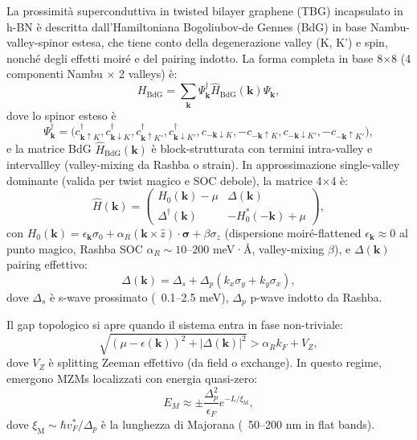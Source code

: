 \documentclass[11pt,a4paper]{article}
\theoremstyle{plain}
\theoremstyle{definition}
\begin{document}
La prossimità superconduttiva in twisted bilayer graphene (TBG) incapsulato in h-BN è descritta dall'Hamiltoniana Bogoliubov-de Gennes (BdG) in base Nambu-valley-spinor estesa, che tiene conto della degenerazione valley (K, K') e spin, nonché degli effetti moiré e del pairing indotto. La forma completa in base 8×8 (4 componenti Nambu × 2 valleys) è:
\begin{equation}
H_{\mathrm{BdG}} = \sum_{\mathbf{k}} \Psi^\dagger_{\mathbf{k}} \hat{H}_{\mathrm{BdG}}(\mathbf{k}) \Psi_{\mathbf{k}},
\end{equation}
dove lo spinor esteso è
\begin{equation}
\Psi^\dagger_{\mathbf{k}} = \bigl( c^\dagger_{\mathbf{k}\uparrow K}, c^\dagger_{\mathbf{k}\downarrow K}, c^\dagger_{\mathbf{k}\uparrow K'}, c^\dagger_{\mathbf{k}\downarrow K'}, 
c_{-\mathbf{k}\downarrow K}, -c_{-\mathbf{k}\uparrow K}, c_{-\mathbf{k}\downarrow K'}, -c_{-\mathbf{k}\uparrow K'} \bigr),
\end{equation}
e la matrice BdG $\hat{H}_{\mathrm{BdG}}(\mathbf{k})$ è block-strutturata con termini intra-valley e intervallley (valley-mixing da Rashba o strain). In approssimazione single-valley dominante (valida per twist magico e SOC debole), la matrice 4×4 è:
\begin{equation}
\hat{H}(\mathbf{k}) = \begin{pmatrix}
H_0(\mathbf{k}) - \mu & \Delta(\mathbf{k}) \\
\Delta^\dagger(\mathbf{k}) & -H_0^*(-\mathbf{k}) + \mu
\end{pmatrix},
\end{equation}
con $H_0(\mathbf{k}) = \epsilon_{\mathbf{k}} \sigma_0 + \alpha_R (\mathbf{k} \times \hat{z}) \cdot \boldsymbol{\sigma} + \beta \sigma_z$ (dispersione moiré-flattened $\epsilon_{\mathbf{k}} \approx 0$ al punto magico, Rashba SOC $\alpha_R \sim 10$--$200$ meV·Å, valley-mixing $\beta$), e $\Delta(\mathbf{k})$ pairing effettivo:
\begin{equation}
\Delta(\mathbf{k}) = \Delta_s + \Delta_p (k_x \sigma_y + k_y \sigma_x),
\end{equation}
dove $\Delta_s$ è s-wave prossimato (~0.1--2.5 meV), $\Delta_p$ p-wave indotto da Rashba.

Il gap topologico si apre quando il sistema entra in fase non-triviale:
\begin{equation}
\sqrt{(\mu - \epsilon(\mathbf{k}))^2 + |\Delta(\mathbf{k})|^2} > \alpha_R k_F + V_Z,
\end{equation}
dove $V_Z$ è splitting Zeeman effettivo (da field o exchange). In questo regime, emergono MZMs localizzati con energia quasi-zero:
\begin{equation}
E_M \approx \pm \frac{\Delta_p^2}{\epsilon_F} e^{-L/\xi_{\text{M}}},
\end{equation}
dove $\xi_{\text{M}} \sim \hbar v_F^* / \Delta_p$ è la lunghezza di Majorana (~50--200 nm in flat bands).
\end{document}
